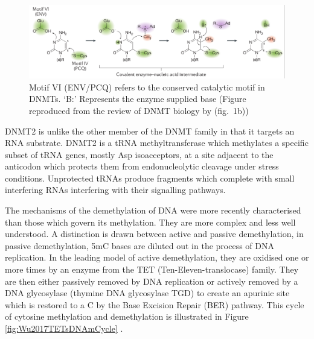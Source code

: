 \documentclass[]{book}
\begin{document}
\begin{figure}

{\centering \includegraphics[width=0.8\linewidth]{figs/Lyko2017DNAmMechanism} 

}

\caption{Motif VI (ENV/PCQ) refers to the conserved catalytic motif in DNMTs. `B:' Represents the enzyme supplied base (Figure reproduced from the review of DNMT biology by \citet{Lyko2017} (fig.~1b))}\label{fig:Lyko2017DNAmMechanism}
\end{figure}



DNMT2 is unlike the other member of the DNMT family in that it targets an RNA substrate. DNMT2 is a tRNA methyltransferase which methylates a specific subset of tRNA genes, mostly Asp isoacceptors, at a site adjacent to the anticodon which protects them from endonucleolytic cleavage under stress conditions. Unprotected tRNAs produce fragments which complete with small interfering RNAs interfering with their signalling pathways.

The mechanisms of the demethylation of DNA were more recently characterised than those which govern its methylation. They are more complex and less well understood. A distinction is drawn between active and passive demethylation, in passive demethylation, 5mC bases are diluted out in the process of DNA replication. In the leading model of active demethylation, they are oxidised one or more times by an enzyme from the TET (Ten-Eleven-translocase) family. They are then either passively removed by DNA replication or actively removed by a DNA glycosylase (thymine DNA glycosylase TGD) to create an apurinic site which is restored to a C by the Base Excision Repair (BER) pathway. This cycle of cytosine methylation and demethylation is illustrated in Figure \ref{fig:Wu2017TETsDNAmCycle} \citep{Wu2017}.
\end{document}
